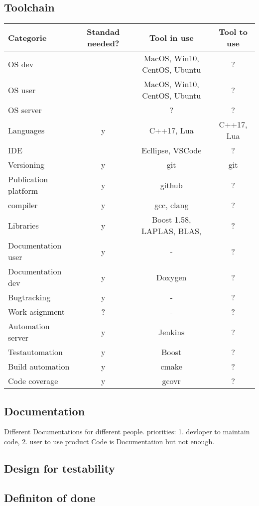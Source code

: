 \documentclass[a4paper]{scrbook}
\begin{document}
        \subsection{Toolchain}
        \begin{tabular}{l|c|c|c}
            Categorie   &   Standad needed? &   Tool in use &   Tool to use\\
            \hline\hline
            OS    dev      &         ~ &   MacOS, Win10, CentOS, Ubuntu    &   ?   \\
            OS    user      &         ~ &   MacOS, Win10, CentOS, Ubuntu    &   ?   \\
            OS    server      &         ~ &   ?    &   ?   \\
            Languages   &   y       &   C++17, Lua  &   C++17, Lua  \\   
            IDE         &         ~  &  Ecllipse, VSCode    &   ?   \\
            Versioning  &   y       &   git &   git \\
            Publication platform    &   y   &   github  &   ?   \\
            compiler    &   y       &   gcc, clang  &   ?   \\
            Libraries   &   y       &   Boost 1.58, LAPLAS, BLAS, &     ?   \\
            Documentation user  &   y   &   -   &   ?   \\
            Documentation dev   &   y   &   Doxygen &   ?   \\
            Bugtracking &   y   &   -   &   ?\\
            Work asignment  &   ?   &   -   &   ?   \\
            Automation server   &   y   &   Jenkins &   ?   \\
            Testautomation  &   y   &   Boost   &   ?   \\
            Build automation &  y   &   cmake   &   ?   \\
            Code coverage   &   y   &   gcovr   &   ?   \\
        \end{tabular}   
        \subsection{Documentation}
        Different Documentations for different people.
        priorities: 1. devloper to maintain code, 2. user to use product
        Code is Documentation but not enough.
        \subsection{Design for testability}

        \subsection{Definiton of done}
\end{document}
